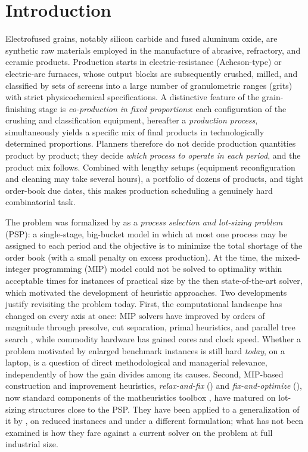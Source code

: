 \section{Introduction}
\label{sec:introduction}

Electrofused grains, notably silicon carbide and fused aluminum oxide,
are synthetic raw materials employed in the manufacture of abrasive,
refractory, and ceramic products. Production starts in
electric-resistance (Acheson-type) or electric-arc furnaces, whose
output blocks are subsequently crushed, milled, and classified by sets
of screens into a large number of granulometric ranges (grits) with
strict physicochemical specifications. A distinctive feature of the
grain-finishing stage is \emph{co-production in fixed proportions}:
each configuration of the crushing and classification equipment, hereafter a \emph{production process}, simultaneously yields a
specific mix of final products in technologically determined
proportions. Planners therefore do not decide production quantities
product by product; they decide \emph{which process to operate in each
period}, and the product mix follows. Combined with lengthy setups
(equipment reconfiguration and cleaning may take several hours),
a portfolio of dozens of products, and tight order-book due dates,
this makes production scheduling a genuinely hard combinatorial task.

The problem was formalized by \citet{luche2009combining} as a
\emph{process selection and lot-sizing problem} (PSP): a single-stage,
big-bucket model in which at most one process may be assigned to each
period and the objective is to minimize the total shortage of the
order book (with a small penalty on excess production). At the time,
the mixed-integer programming (MIP) model could not be solved to
optimality within acceptable times for instances of practical size by
the then state-of-the-art solver, which motivated the development of
heuristic approaches. Two developments justify revisiting the problem
today. First, the computational landscape has changed on
every axis at once: MIP solvers have improved by orders of magnitude
through presolve, cut separation, primal heuristics, and parallel tree
search \citep{koch2022progress,achterberg2013analyzing,achterberg2020presolve},
while commodity hardware has gained cores and clock speed. Whether a
problem motivated by enlarged benchmark instances is still hard \emph{today}, on
a laptop, is a question of direct methodological and managerial relevance, independently
of how the gain divides among its causes. Second, MIP-based
construction and improvement heuristics, \emph{relax-and-fix} (\RF) and \emph{fix-and-optimize} (\FO), now
standard components of the matheuristics toolbox
\citep{sahling2009solving,helber2010fix,toledo2015relax}, have
matured on lot-sizing structures close to the PSP. They have been
applied to a generalization of it by \citet{villasboas2021modeling},
on reduced instances and under a different formulation; what has not
been examined is how they fare against a current solver on the problem
at full industrial size.

